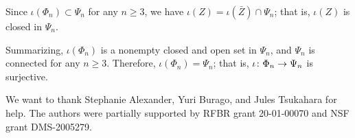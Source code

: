 Since $\iota(\Phi_n)\subset \Psi_n$ for any $n\ge 3$, we have  $\iota (Z)=\iota(\bar Z)\cap \Psi_n$;
that is, $\iota (Z)$ is closed in $\Psi_n$. 

\medskip

Summarizing, $\iota(\Phi_n)$ is a nonempty closed and open set in $\Psi_n$, and $\Psi_n$ is connected for any $n\ge 3$.
Therefore, $\iota(\Phi_n)=\Psi_n$; that is, $\iota\:\Phi_n\z\to\Psi_n$ is surjective.
\qeds

 We want to thank Stephanie Alexander, Yuri Burago, and Jules %
Tsukahara for help. 
The authors were partially supported by RFBR grant 20-01-00070 and NSF grant DMS-2005279.
